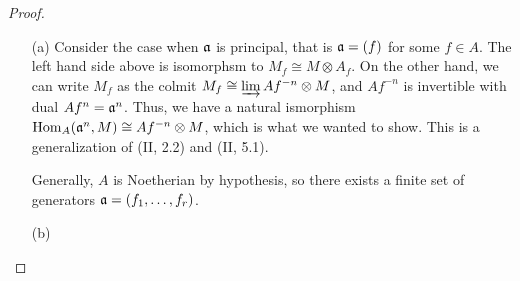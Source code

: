 \documentclass{article}
\begin{document}
\begin{enumerate} [label=\textbf{\arabic*.}, leftmargin=0em]
\begin{proof} $ $ \vspace{0pt}
\begin{itemize} [leftmargin=0cm]
\item[(a)] Consider the case when $\mathfrak{a}$ is principal, that is $\mathfrak{a} = (f)$ for some $f \in A$.
The left hand side above is isomorphsm to $M_f \cong M \otimes A_f$.
On the other hand, we can write $M_f$ as the colmit $M_f \cong \varinjlim Af^{-n} \otimes M$, and $Af^{-n}$ is invertible with dual $Af^n = \mathfrak{a}^n$.
Thus, we have a natural ismorphism $\operatorname{Hom}_A(\mathfrak{a}^n, M) \cong Af^{-n} \otimes M$, which is what we wanted to show.
This is a generalization of (II, 2.2) and (II, 5.1).

Generally, $A$ is Noetherian by hypothesis, so there exists a finite set of generators $\mathfrak{a} = (f_1, \dots, f_r)$.



\item[(b)]
\end{itemize} 
\end{proof}

\end{enumerate}
\end{document}

